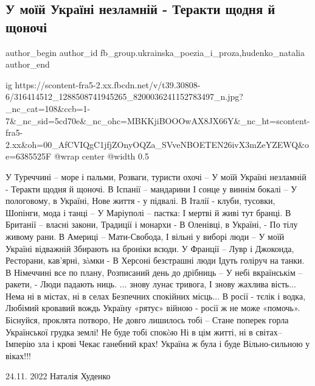  
 
 
 
 
 
\subsection{У моїй Україні незламній - Теракти щодня й щоночі}
\label{sec:24_11_2022.fb.fb_group.ukrainska_poezia_i_proza.1.ukraina_nezlamna}
 
\ifcmt
 author_begin
   author_id fb_group.ukrainska_poezia_i_proza,hudenko_natalia
 author_end
\fi

\ifcmt
  ig https://scontent-fra5-2.xx.fbcdn.net/v/t39.30808-6/316414512_1288508741945265_8200036241152783497_n.jpg?_nc_cat=108&ccb=1-7&_nc_sid=5cd70e&_nc_ohc=MBKKjiBOOOwAX8JX66Y&_nc_ht=scontent-fra5-2.xx&oh=00_AfCVIQgC1jfjZOnyOQZa_SVveNBOETEN26ivX3mZeYZEWQ&oe=6385525F
  @wrap center
  @width 0.5
\fi

\raggedcolumns
\begin{multicols}{2} %
\setlength{\parindent}{0pt}
\obeycr
У Туреччині – море і пальми,
Розваги, туристи охочі –
У моїй Україні незламній - 
Теракти щодня й щоночі.
В Іспанії – мандарини
І сонце у виннім бокалі –
У пологовому, в Україні, 
Нове життя - у підвалі.
В Італії - клуби, тусовки,
Шопінги, мода і танці –
У Маріуполі – пастка:
І мертві й живі тут бранці.
В Британії – власні закони,
Традиції і монархи -
В Оленівці, в Україні, - 
По тілу живому рани.
В Америці – Мати-Свобода,
І вільні у виборі люди –
У моїй Україні відважній
Збирають на броніки всюди.
У Франції – Лувр і Джоконда,
Ресторани, кав'ярні, зàмки -
В Херсоні безстрашні люди
Ідуть голіруч на танки.
В Німеччині все по плану,
Розписаний день до дрібниць –
У небі вкраїнськім – ракети, - 
Люди падають ниць.
... знову лунає тривога,
І знову жахлива вість...
Нема ні в містах, ні в селах
Безпечних спокійних місць...
В росії - тєлік і водка,
Любімий кровавий вождь
Україну «рятує» війною -
росії ж не може «помочь».
Біснуйся, проклята потворо,
Не довго лишилось тобі –
Стане поперек горла 
Української грудка землі!
Не буде тобі спокòю
Ні в цім житті, ні в світах–
Імперію зла і крові 
Чекає ганебний крах!
Україна ж була і буде
Вільно-сильною у віках!!!
\restorecr
\end{multicols} %

24.11. 2022  Наталія Худенко

